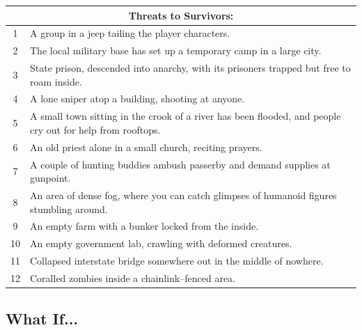 \documentclass[a4,landscape]{book}
\begin{document}
\begin{multicols*}{4}
\columnbreak
\begin{center}
  \begin{tabular}{|c|p{}|}
    \hline \multicolumn{2}{|c|}{Threats to Survivors:} \\
    \hline 1 & A group in a jeep tailing the player characters. \\
    2 & The local military base has set up a temporary camp in a large city. \\
    3 & State prison, descended into anarchy, with its prisoners trapped but free to roam inside. \\
    4 & A lone sniper atop a building, shooting at anyone. \\
    5 & A small town sitting in the crook of a river has been flooded, and people cry out for help from rooftops. \\
    6 & An old priest alone in a small church, reciting prayers. \\
    7 & A couple of hunting buddies ambush passerby and demand supplies at gunpoint. \\
    8 & An area of dense fog, where you can catch glimpses of humanoid figures stumbling around. \\
    9 & An empty farm with a bunker locked from the inside.  \\
    10 & An empty government lab, crawling with deformed creatures. \\
    11 & Collapsed interstate bridge somewhere out in the middle of nowhere. \\
    12 & Coralled zombies inside a chainlink--fenced area. \\ \hline
  \end{tabular}
\end{center}

\subsection*{What If...}


\end{multicols*}
\end{document}
